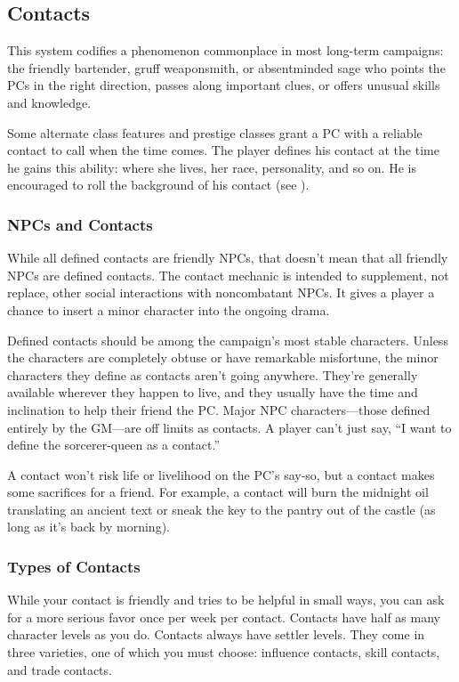 \subsection{Contacts}
\label{sec:contacts}
This system codifies a phenomenon commonplace in most long-term campaigns: the friendly bartender, gruff weaponsmith, or absentminded sage who points the PCs in the right direction, passes along important clues, or offers unusual skills and knowledge.

Some alternate class features and prestige classes grant a PC with a reliable contact to call when the time comes. The player defines his contact at the time he gains this ability: where she lives, her race, personality, and so on. He is encouraged to roll the background of his contact (see ).

\subsubsection{NPCs and Contacts}
While all defined contacts are friendly NPCs, that doesn't mean that all friendly NPCs are defined contacts. The contact mechanic is intended to supplement, not replace, other social interactions with noncombatant NPCs. It gives a player a chance to insert a minor character into the ongoing drama.

Defined contacts should be among the campaign's most stable characters. Unless the characters are completely obtuse or have remarkable misfortune, the minor characters they define as contacts aren't going anywhere. They're generally available wherever they happen to live, and they usually have the time and inclination to help their friend the PC. Major NPC characters---those defined entirely by the GM---are off limits as contacts. A player can't just say, ``I want to define the sorcerer-queen as a contact.''

A contact won't risk life or livelihood on the PC's say-so, but a contact makes some sacrifices for a friend. For example, a contact will burn the midnight oil translating an ancient text or sneak the key to the pantry out of the castle (as long as it's back by morning).

\subsubsection{Types of Contacts}
While your contact is friendly and tries to be helpful in small ways, you can ask for a more serious favor once per week per contact. Contacts have half as many character levels as you do. Contacts always have settler levels. They come in three varieties, one of which you must choose: influence contacts, skill contacts, and trade contacts.

